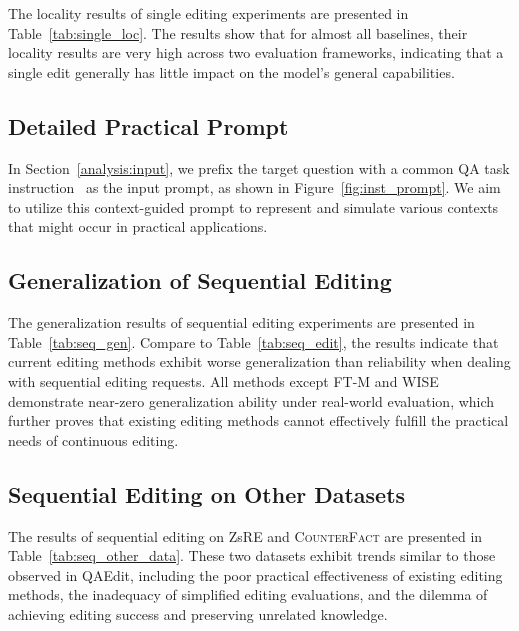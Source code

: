 The locality results of single editing experiments are presented in Table~\ref{tab:single_loc}.
The results show that for almost all baselines, their locality results are very high across two evaluation frameworks, indicating that a single edit generally has little impact on the model's general capabilities.



\subsection{Detailed Practical Prompt}
\label{apd:prac_prompt}




In Section~\ref{analysis:input}, we prefix the target question with a common QA task instruction~\cite{eval-harness} as the input prompt, as shown in Figure~\ref{fig:inst_prompt}. 
We aim to utilize this context-guided prompt to represent and simulate various contexts that might occur in practical applications.





\subsection{Generalization of Sequential Editing}
\label{apd:gen_seq}







The generalization results of sequential editing experiments are presented in Table~\ref{tab:seq_gen}.
Compare to Table~\ref{tab:seq_edit}, the results indicate that current editing methods exhibit worse generalization than reliability when dealing with sequential editing requests. 
All methods except FT-M and WISE demonstrate near-zero generalization ability under real-world evaluation, which further proves that existing editing methods cannot effectively fulfill the practical needs of continuous editing.


\subsection{Sequential Editing on Other Datasets}
\label{apd:seq_other_llm}


The results of sequential editing on ZsRE and \textsc{CounterFact} are presented in Table~\ref{tab:seq_other_data}. 
These two datasets exhibit trends similar to those observed in QAEdit, including the poor practical effectiveness of existing editing methods, the inadequacy of simplified editing evaluations, and the dilemma of achieving editing success and preserving unrelated knowledge.

